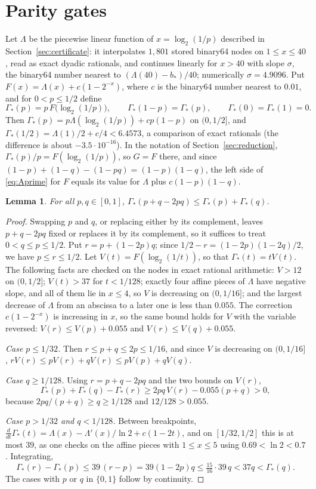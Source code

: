 \documentclass[11pt]{amsart}
\newtheorem{lemma}[theorem]{Lemma}
\theoremstyle{remark}
\begin{document}
\section{Parity gates}\label{sec:xor}

Let $\Lambda$ be the piecewise linear function of $x=\log_2(1/p)$ described in Section~\ref{sec:certificate}: it interpolates $1{,}801$ stored binary64 nodes on $1\le x\le 40$, read as exact dyadic rationals, and continues linearly for $x>40$ with slope $\sigma$, the binary64 number nearest to $(\Lambda(40)-b_*)/40$; numerically $\sigma=4.9096$. Put $F(x)=\Lambda(x)+c(1-2^{-x})$, where $c$ is the binary64 number nearest to $0.01$, and for $0<p\le1/2$ define
\[
\Gamma_*(p)=p\,F\bigl(\log_2(1/p)\bigr),\qquad \Gamma_*(1-p)=\Gamma_*(p),\qquad \Gamma_*(0)=\Gamma_*(1)=0 .
\]
Then $\Gamma_*(p)=p\Lambda(\log_2(1/p))+cp(1-p)$ on $(0,1/2]$, and $\Gamma_*(1/2)=\Lambda(1)/2+c/4<6.4573$, a comparison of exact rationals (the difference is about $-3.5\cdot10^{-16}$). In the notation of Section~\ref{sec:reduction}, $\Gamma_*(p)/p=F(\log_2(1/p))$, so $G=F$ there, and since $(1-p)+(1-q)-(1-pq)=(1-p)(1-q)$, the left side of \eqref{eq:Aprime} for $F$ equals its value for $\Lambda$ plus $c(1-p)(1-q)$.

\begin{lemma}\label{lem:xor}
For all $p,q\in[0,1]$, $\Gamma_*(p+q-2pq)\le\Gamma_*(p)+\Gamma_*(q)$.
\end{lemma}

\begin{proof}
Swapping $p$ and $q$, or replacing either by its complement, leaves $p+q-2pq$ fixed or replaces it by its complement, so it suffices to treat $0<q\le p\le1/2$. Put $r=p+(1-2p)q$; since $1/2-r=(1-2p)(1-2q)/2$, we have $p\le r\le 1/2$. Let $V(t)=F(\log_2(1/t))$, so that $\Gamma_*(t)=tV(t)$. The following facts are checked on the nodes in exact rational arithmetic: $V>12$ on $(0,1/2]$; $V(t)>37$ for $t<1/128$; exactly four affine pieces of $\Lambda$ have negative slope, and all of them lie in $x\le 4$, so $V$ is decreasing on $(0,1/16]$; and the largest decrease of $\Lambda$ from an abscissa to a later one is less than $0.055$. The correction $c(1-2^{-x})$ is increasing in $x$, so the same bound holds for $V$ with the variable reversed: $V(r)\le V(p)+0.055$ and $V(r)\le V(q)+0.055$.

\emph{Case $p\le 1/32$.} Then $r\le p+q\le 2p\le 1/16$, and since $V$ is decreasing on $(0,1/16]$, $rV(r)\le pV(r)+qV(r)\le pV(p)+qV(q)$.

\emph{Case $q\ge 1/128$.} Using $r=p+q-2pq$ and the two bounds on $V(r)$,
\[
\Gamma_*(p)+\Gamma_*(q)-\Gamma_*(r)\ge 2pq\,V(r)-0.055(p+q)>0,
\]
because $2pq/(p+q)\ge q\ge 1/128$ and $12/128>0.055$.

\emph{Case $p>1/32$ and $q<1/128$.} Between breakpoints, $\frac{d}{dt}\Gamma_*(t)=\Lambda(x)-\Lambda'(x)/\ln 2+c(1-2t)$, and on $[1/32,1/2]$ this is at most $39$, as one checks on the affine pieces with $1\le x\le 5$ using $0.69<\ln 2<0.7$. Integrating,
\[
\Gamma_*(r)-\Gamma_*(p)\le 39\,(r-p)=39(1-2p)q\le\tfrac{15}{16}\cdot 39\,q<37q<\Gamma_*(q).
\]
The cases with $p$ or $q$ in $\{0,1\}$ follow by continuity.
\end{proof}
\end{document}
